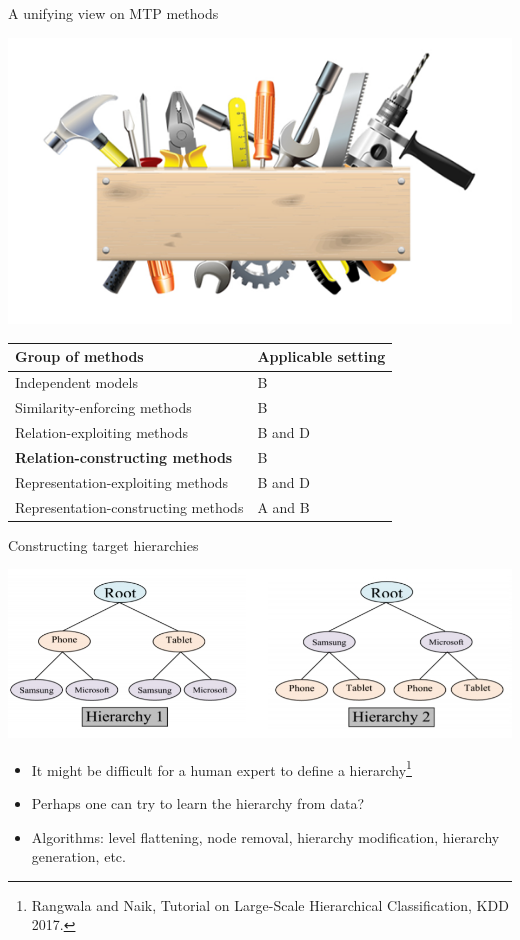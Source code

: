 \documentclass[]{beamer}
\renewcommand{\alert}[1]{\textbf{\color{putblue} #1}}
\begin{document}
\begin{frame}{A unifying view on MTP methods}

\begin{center}
\includegraphics[scale=0.3]{pics/tools}

\begin{tabular}{ll}
\hline
Group of methods & Applicable setting \\
\hline
\hline
Independent models & B \\
Similarity-enforcing methods & B   \\ 
Relation-exploiting methods & B and D  \\
\alert{Relation-constructing methods} & B \\
Representation-exploiting methods & B and D \\
Representation-constructing methods & A and B \\
\hline  
\end{tabular}
\end{center}
\end{frame}




\begin{frame}{Constructing target hierarchies}

\includegraphics[width=\textwidth]{pics/hierarchies}

\begin{itemize}
\item It might be difficult for a human expert to define a hierarchy\footnote{Rangwala and Naik, Tutorial on Large-Scale Hierarchical Classification, KDD 2017.}
\item Perhaps one can try to learn the hierarchy from data? 
\item Algorithms: level flattening, node removal, hierarchy modification, hierarchy generation, etc.
\end{itemize}


\end{frame}
\end{document}
